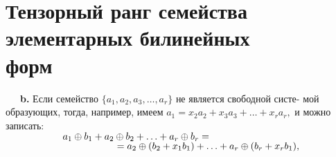 \documentclass{mai_book}
\begin{document}
\section{Тензорный ранг семейства элементарных билинейных \\
 форм} 

\indent~~~\textbf{b.}  Если семейство $\{a_1,a_2,a_3,\ldots,a_r\}$ не является свободной систе-\linebreak
мой образующих, тогда, например, имеем $a_1=x_2a_2+x_3a_3+\ldots+x_ra_r,$\linebreak
и можно записать:  \\

$\indent~~~~~~~~~~~~~a_1\oplus b_1+a_2\oplus b_2+\ldots+a_r\oplus b_r =$ \\
$\indent ~~~~~~~~~~~~~~~~~~~~~~~~~~~~~=a_2\oplus(b_2+x_1b_1)+\ldots+a_r\oplus(b_r+x_rb_1),$
\end{document}
